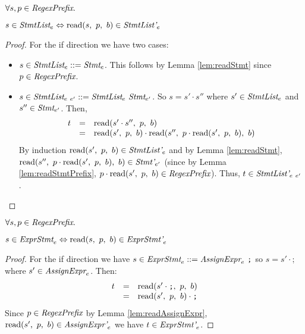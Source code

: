 \documentclass[preprint,10pt]{sigplanconf}
\begin{document}
\begin{lemma}\mbox{}

  \( \forall s, p \in \textit{RegexPrefix}. \)

  \( s \in \textit{StmtList}_{e} \Leftrightarrow 
  \textrm{read}(s,~p,~b) \in \textit{StmtList'}_{e} \)
\end{lemma}
\begin{proof}
  For the if direction we have two cases:
  \begin{itemize}
  \item \( s \in \textit{StmtList}_{e} ::= \textit{Stmt}_{e} \).
    This follows by Lemma \ref{lem:readStmt} since \( p \in \textit{RegexPrefix} \).

  \item \( s \in \textit{StmtList}_{e~e'} ::=
    \textit{StmtList}_{e}~ \textit{Stmt}_{e'} \). So 
    \( s = s' \cdot s'' \) where \( s' \in \textit{StmtList}_{e} \)
    and \( s'' \in \textit{Stmt}_{e'} \). Then,
    \[
    \begin{array}{rcl}
      t &=& \textrm{read}(s' \cdot s'',~p,~b)
      \\
      &=& \textrm{read}(s',~p,~b) \cdot \textrm{read}(s'',~p \cdot \textrm{read}(s',~p,~b),~b)
    \end{array}
    \]
    By induction \( \textrm{read}(s',~p,~b) \in \textit{StmtList'}_{e} \)
    and by Lemma \ref{lem:readStmt}, \( \textrm{read}(s'',~p \cdot
      \textrm{read}(s',~p,~b),~b) \in \textit{Stmt'}_{e'} \) (since by
    Lemma \ref{lem:readStmtPrefix}, \( p \cdot \textrm{read}(s',~p,~b)
    \in \textit{RegexPrefix} \)).
    Thus, \( t \in \textit{StmtList'}_{e~e'} \).
  \end{itemize}
\end{proof}

\begin{lemma}\mbox{}
  
  \( \forall s, p \in \textit{RegexPrefix}. \)

  \( s \in \textit{ExprStmt}_{e} \Leftrightarrow 
  \textrm{read}(s,~p,~b) \in \textit{ExprStmt'}_{e} \)
\end{lemma}
\begin{proof}
  For the if direction we have 
  \( s \in \textit{ExprStmt}_{e} ::=
  \textit{AssignExpr}_{e}~\texttt{;} \) so \( s = s' \cdot
  \texttt{;} \) where \( s' \in \textit{AssignExpr}_{e} \).
  Then:
  \[
  \begin{array}{rcl}
    t &=& \textrm{read}(s'\cdot \texttt{;},~p,~b)
    \\
    &=& \textrm{read}(s',~p,~b) \cdot \texttt{;}
  \end{array}
  \]
  Since \( p \in \textit{RegexPrefix} \) by Lemma
  \ref{lem:readAssignExpr}, \( \textrm{read}(s',~p,~b) \in
  \textit{AssignExpr'}_{e} \) we have \( t \in
  \textit{ExprStmt'}_{e} \).
\end{proof}
\end{document}
